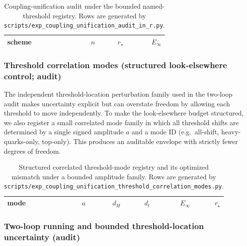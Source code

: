 \begin{table}[H]
\centering
\small
\setlength{\tabcolsep}{8pt}
\renewcommand{\arraystretch}{1.15}
\begin{tabular}{lrrr}
\toprule
scheme & $n$ & $r_\star$ & $E_\infty$ \\
\midrule
%
\end{tabular}
\caption{Coupling-unification audit under the bounded named-threshold registry. Rows are generated by \texttt{scripts/exp\_coupling\_unification\_audit\_in\_r.py}.}
\label{tab:coupling_unification_threshold_audit}
\end{table}

\subsubsection{Threshold correlation modes (structured look-elsewhere control; audit)}
\label{subsec:coupling_unification_threshold_corr_modes}
\AuditTag The independent threshold-location perturbation family used in the two-loop audit makes uncertainty explicit but can overstate freedom by allowing each threshold to move independently.
To make the look-elsewhere budget structured, we also register a small correlated mode family in which all threshold shifts are determined by a single signed amplitude $a$ and a mode ID (e.g.\ all-shift, heavy-quarks-only, top-only).
This produces an auditable envelope with strictly fewer degrees of freedom.

%

\begin{table}[H]
\centering
\small
\setlength{\tabcolsep}{8pt}
\renewcommand{\arraystretch}{1.15}
\begin{tabular}{lrrrrr}
\toprule
mode & $a$ & $d_H$ & $d_t$ & $E_\infty$ & $r_\star$ \\
\midrule
%
\end{tabular}
\caption{Structured correlated threshold-mode registry and its optimized mismatch under a bounded amplitude family. Rows are generated by \texttt{scripts/exp\_coupling\_unification\_threshold\_correlation\_modes.py}.}
\label{tab:coupling_unification_threshold_corr_modes}
\end{table}

\subsubsection{Two-loop running and bounded threshold-location uncertainty (audit)}
\label{subsec:coupling_unification_two_loop_audit}
